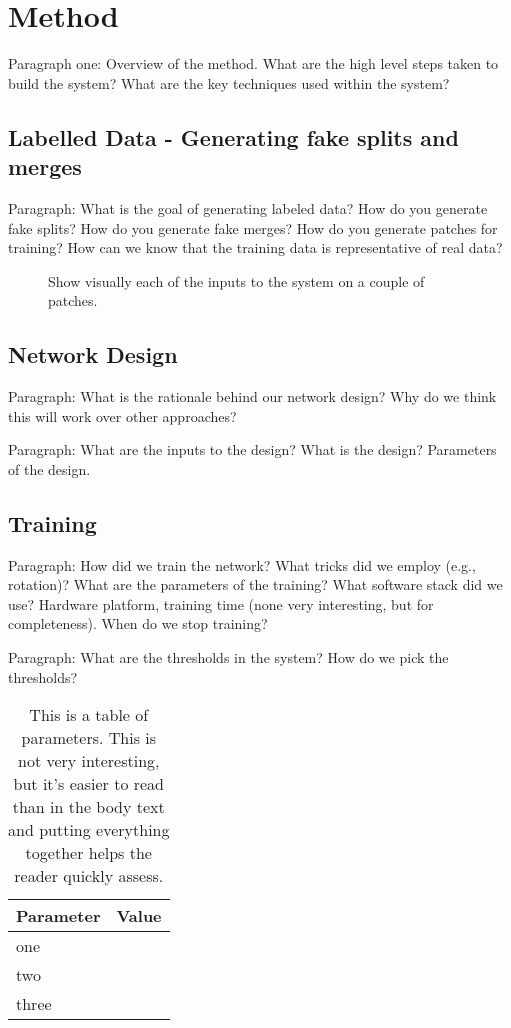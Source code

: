 \section{Method}

Paragraph one: Overview of the method. What are the high level steps taken to build the system? What are the key techniques used within the system?

\subsection{Labelled Data - Generating fake splits and merges}

Paragraph: What is the goal of generating labeled data? How do you generate fake splits? How do you generate fake merges? How do you generate patches for training? How can we know that the training data is representative of real data?

\begin{figure}
\caption{Show visually each of the inputs to the system on a couple of patches.}
\end{figure}

\subsection{Network Design}

Paragraph: What is the rationale behind our network design? Why do we think this will work over other approaches? 

Paragraph: What are the inputs to the design? What is the design? Parameters of the design.

\subsection{Training}

Paragraph: How did we train the network? What tricks did we employ (e.g., rotation)? What are the parameters of the training? What software stack did we use? Hardware platform, training time (none very interesting, but for completeness). When do we stop training?

Paragraph: What are the thresholds in the system? How do we pick the thresholds?

\begin{table}
\begin{tabular}{ll}
\toprule
Parameter & Value \\
\midrule
one & \\
two & \\
three & \\
\bottomrule
\end{tabular}
\caption{This is a table of parameters. This is not very interesting, but it's easier to read than in the body text and putting everything together helps the reader quickly assess.}
\end{table}